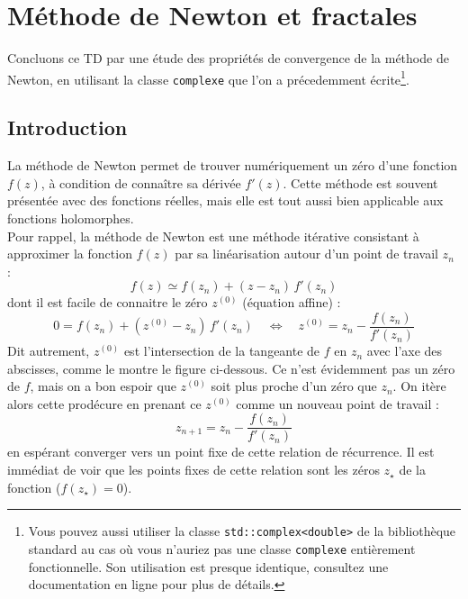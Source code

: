 \documentclass{book}
\newcommand{\inline}[1]{\texttt{#1}}
\begin{document}

\newpage
\section{Méthode de Newton et fractales}

Concluons ce TD par une étude des propriétés de convergence de la méthode de Newton, en utilisant la classe \inline{complexe} que l'on a précedemment écrite\footnote{Vous pouvez aussi utiliser la classe \inline{std::complex<double>} de la bibliothèque standard au cas où vous n'auriez pas une classe \inline{complexe} entièrement fonctionnelle. Son utilisation est presque identique, consultez une documentation en ligne pour plus de détails.}.\\

\subsection{Introduction}

La méthode de Newton permet de trouver numériquement un zéro d'une fonction $f(z)$, à condition de connaître sa dérivée $f'(z)$. Cette méthode est souvent présentée avec des fonctions réelles, mais elle est tout aussi bien applicable aux fonctions holomorphes.\\

Pour rappel, la méthode de Newton est une méthode itérative consistant à approximer la fonction $f(z)$ par sa linéarisation autour d'un point de travail $z_n$ :
\begin{equation*}
f(z) \simeq f(z_n) + (z-z_n)\,f'(z_n)
\end{equation*}
dont il est facile de connaitre le zéro $z^{(0)}$ (équation affine) :
\begin{equation*}
0 = f(z_n) + (z^{(0)} - z_n)\,f'(z_n) \quad \Leftrightarrow \quad z^{(0)} = z_n - \frac{f(z_n)}{f'(z_n)}
\end{equation*}
Dit autrement, $z^{(0)}$ est l'intersection de la tangeante de $f$ en $z_n$ avec l'axe des abscisses, comme le montre le figure ci-dessous. Ce n'est évidemment pas un zéro de $f$, mais on a bon espoir que $z^{(0)}$ soit plus proche d'un zéro que $z_n$. On itère alors cette prodécure en prenant ce $z^{(0)}$ comme un nouveau point de travail :
\begin{equation*}
z_{n+1} = z_n - \frac{f(z_n)}{f'(z_n)}
\end{equation*}
en espérant converger vers un point fixe de cette relation de récurrence. Il est immédiat de voir que les points fixes de cette relation sont les zéros $z_\star$ de la fonction ($f(z_\star)=0$).
\end{document}
